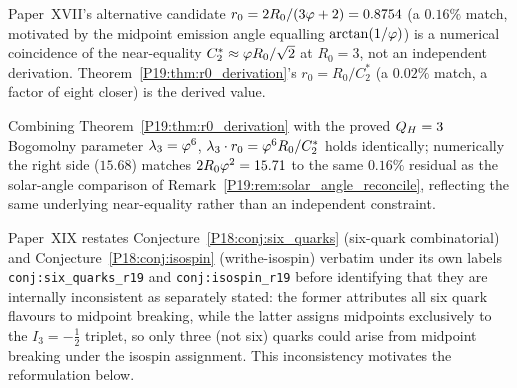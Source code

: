 \begin{remark}
\label{P19:rem:solar_angle_reconcile}
Paper~XVII's alternative candidate $r_0=2R_0/(3\varphi+2)=0.8754$
(a $0.16\%$ match, motivated by the midpoint emission angle equalling
$\arctan(1/\varphi)$) is a numerical coincidence of the near-equality
$C_2^*\approx\varphi R_0/\sqrt2$ at $R_0=3$, not an independent derivation.
Theorem~\ref{P19:thm:r0_derivation}'s $r_0=R_0/C_2^*$ (a $0.02\%$
match, a factor of eight closer) is the derived value.
\end{remark}

\begin{corollary}[The Bogomolny consistency $\lambda_3\cdot r_0=2R_0\vp^2$]
\label{P19:cor:lambda3_consistency}
Combining Theorem~\ref{P19:thm:r0_derivation} with the proved $Q_H=3$
Bogomolny parameter $\lambda_3=\varphi^6$, $\lambda_3\cdot r_0=\varphi^6 R_0/C_2^*$
holds identically; numerically the right side ($15.68$) matches
$2R_0\varphi^2=15.71$ to the same $0.16\%$ residual as the solar-angle
comparison of Remark~\ref{P19:rem:solar_angle_reconcile}, reflecting
the same underlying near-equality rather than an independent
constraint.
\end{corollary}


\begin{remark}
\label{P19:conj:six_quarks_r19}
\label{P19:conj:isospin_r19}
Paper~XIX restates Conjecture~\ref{P18:conj:six_quarks} (six-quark
combinatorial) and Conjecture~\ref{P18:conj:isospin} (writhe-isospin)
verbatim under its own labels \texttt{conj:six\_quarks\_r19} and
\texttt{conj:isospin\_r19} before identifying that they are
internally inconsistent as separately stated: the former attributes
all six quark flavours to midpoint breaking, while the latter assigns
midpoints exclusively to the $I_3=-\tfrac12$ triplet, so only three
(not six) quarks could arise from midpoint breaking under the
isospin assignment. This inconsistency motivates the reformulation
below.
\end{remark}

